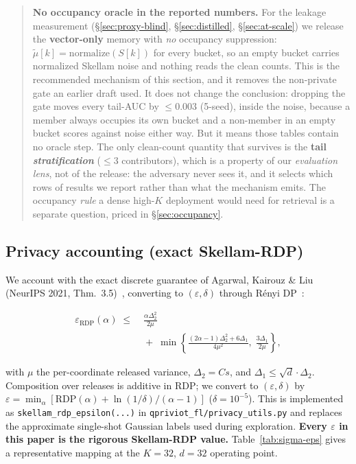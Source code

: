 \documentclass[pdflatex,sn-mathphys-num,iicol]{sn-jnl}
\theoremstyle{thmstyleone}%
\theoremstyle{thmstyletwo}%
\theoremstyle{thmstylethree}%
\newcommand{\eps}{\varepsilon}
\newcommand{\secref}[1]{\S\ref{#1}}
\begin{document}
\begin{quote}
\textbf{No occupancy oracle in the reported numbers.} For the leakage measurement
(\secref{sec:proxy-blind}, \secref{sec:distilled}, \secref{sec:at-scale}) we release
the \textbf{vector-only} memory with \emph{no} occupancy suppression:
$\tilde\mu[k] = \mathrm{normalize}(S[k])$ for every bucket, so an empty bucket carries
normalized Skellam noise and nothing reads the clean counts. This is the recommended
mechanism of this section, and it removes the non-private gate an earlier draft used.
It does not change the conclusion: dropping the gate moves every tail-AUC by
$\leq 0.003$ (5-seed), inside the noise, because a member always occupies its own
bucket and a non-member in an empty bucket scores against noise either way. But it
means those tables contain no oracle step. The only clean-count quantity that survives
is the \textbf{tail \emph{stratification}} ($\leq 3$ contributors), which is a property
of our \emph{evaluation lens}, not of the release: the adversary never sees it, and it
selects which rows of results we report rather than what the mechanism emits. The
occupancy \emph{rule} a dense high-$K$ deployment would need for retrieval is a
separate question, priced in \secref{sec:occupancy}.
\end{quote}

\subsection{Privacy accounting (exact Skellam-RDP)}\label{sec:accounting}

We account with the exact discrete guarantee of Agarwal, Kairouz \& Liu (NeurIPS
2021, Thm.~3.5)~\cite{agarwal2021skellam}, converting to $(\eps,\delta)$ through
R\'enyi DP~\cite{mironov2017rdp}:

\begin{equation}\label{eq:skellam-rdp}
\begin{split}
  \eps_{\mathrm{RDP}}(\alpha) \;\leq\;
  &\frac{\alpha \Delta_2^2}{2\mu} \\[2pt]
  &{}+\; \min\!\left\{
    \frac{(2\alpha - 1)\Delta_2^2 + 6\Delta_1}{4\mu^2},\;
    \frac{3\Delta_1}{2\mu}
  \right\},
\end{split}
\end{equation}

with $\mu$ the per-coordinate released variance, $\Delta_2 = C s$, and
$\Delta_1 \leq \sqrt{d} \cdot \Delta_2$. Composition over releases is additive in
RDP; we convert to $(\eps, \delta)$ by
$\eps = \min_\alpha \left[ \mathrm{RDP}(\alpha) + \ln(1/\delta)/(\alpha - 1) \right]$
($\delta = 10^{-5}$). This is implemented as \texttt{skellam\_rdp\_epsilon(...)} in
\texttt{qpriviot\_fl/privacy\_utils.py} and replaces the approximate single-shot
Gaussian labels used during exploration. \textbf{Every $\eps$ in this paper is the
rigorous Skellam-RDP value.} Table~\ref{tab:sigma-eps} gives a representative mapping
at the $K = 32$, $d = 32$ operating point.
\end{document}
